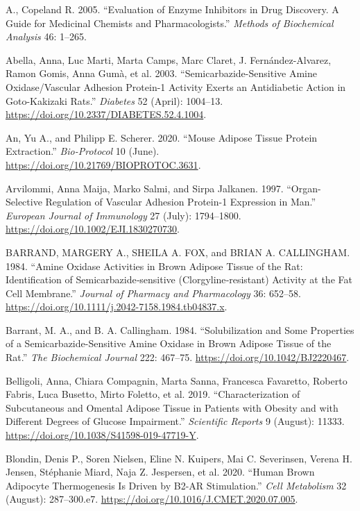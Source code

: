 \documentclass[
  letterpaper,
  DIV=11,
  numbers=noendperiod]{scrreprt}
\newlength{\cslhangindent}
\newenvironment{CSLReferences}[2] %
 {\begin{list}{}{%
  \setlength{\itemindent}{0pt}
  \setlength{\leftmargin}{0pt}
  \setlength{\parsep}{0pt}
  \ifodd #1
   \setlength{\leftmargin}{\cslhangindent}
   \setlength{\itemindent}{-1\cslhangindent}
  \fi
  \setlength{\itemsep}{#2\baselineskip}}}
 {\end{list}}
\begin{document}
\label{refs}
\begin{CSLReferences}{1}{0}
A., Copeland R. 2005. {``Evaluation of Enzyme Inhibitors in Drug
Discovery. A Guide for Medicinal Chemists and Pharmacologists.''}
\emph{Methods of Biochemical Analysis} 46: 1--265.

Abella, Anna, Luc Marti, Marta Camps, Marc Claret, J. Fernández-Alvarez,
Ramon Gomis, Anna Gumà, et al. 2003. {``Semicarbazide-Sensitive Amine
Oxidase/Vascular Adhesion Protein-1 Activity Exerts an Antidiabetic
Action in Goto-Kakizaki Rats.''} \emph{Diabetes} 52 (April): 1004--13.
\url{https://doi.org/10.2337/DIABETES.52.4.1004}.

An, Yu A., and Philipp E. Scherer. 2020. {``Mouse Adipose Tissue Protein
Extraction.''} \emph{Bio-Protocol} 10 (June).
\url{https://doi.org/10.21769/BIOPROTOC.3631}.

Arvilommi, Anna Maija, Marko Salmi, and Sirpa Jalkanen. 1997.
{``Organ-Selective Regulation of Vascular Adhesion Protein-1 Expression
in Man.''} \emph{European Journal of Immunology} 27 (July): 1794--1800.
\url{https://doi.org/10.1002/EJI.1830270730}.

BARRAND, MARGERY A., SHEILA A. FOX, and BRIAN A. CALLINGHAM. 1984.
{``Amine Oxidase Activities in Brown Adipose Tissue of the Rat:
Identification of Semicarbazide‐sensitive (Clorgyline‐resistant)
Activity at the Fat Cell Membrane.''} \emph{Journal of Pharmacy and
Pharmacology} 36: 652--58.
\url{https://doi.org/10.1111/j.2042-7158.1984.tb04837.x}.

Barrant, M. A., and B. A. Callingham. 1984. {``Solubilization and Some
Properties of a Semicarbazide-Sensitive Amine Oxidase in Brown Adipose
Tissue of the Rat.''} \emph{The Biochemical Journal} 222: 467--75.
\url{https://doi.org/10.1042/BJ2220467}.

Belligoli, Anna, Chiara Compagnin, Marta Sanna, Francesca Favaretto,
Roberto Fabris, Luca Busetto, Mirto Foletto, et al. 2019.
{``Characterization of Subcutaneous and Omental Adipose Tissue in
Patients with Obesity and with Different Degrees of Glucose
Impairment.''} \emph{Scientific Reports} 9 (August): 11333.
\url{https://doi.org/10.1038/S41598-019-47719-Y}.

Blondin, Denis P., Soren Nielsen, Eline N. Kuipers, Mai C. Severinsen,
Verena H. Jensen, Stéphanie Miard, Naja Z. Jespersen, et al. 2020.
{``Human Brown Adipocyte Thermogenesis Is Driven by Β2-AR
Stimulation.''} \emph{Cell Metabolism} 32 (August): 287--300.e7.
\url{https://doi.org/10.1016/J.CMET.2020.07.005}.


\end{CSLReferences}
\end{document}
